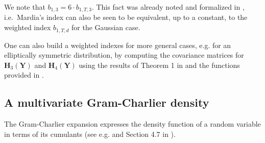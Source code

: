 We note that \(b_{1,3}=6 \cdot b_{1,T,3}\). This fact was already noted and formalized in \citet{jamma2021SJS}, i.e.~Mardia's index can also be seen to be equivalent, up to a constant, to the weighted index \(b_{1,T,d}\) for the Gaussian case.

One can also build a weighted indexes for more general cases, e.g.
for an elliptically symmetric distribution, by computing the covariance
matrices for \(\mathbf{H}_3(\mathbf{Y})\) and \(\mathbf{H}_4(\mathbf{Y})\) using the results of Theorem 1 in \citet{jamma2021SJS} and the functions provided in .

\hypertarget{a-multivariate-gram-charlier-density}{%
\subsection{A multivariate Gram-Charlier density}\label{a-multivariate-gram-charlier-density}}

The Gram-Charlier expansion expresses the density function of a random variable in terms of its cumulants (see e.g. \citet{brenn2017revisit} and Section 4.7 in \citet{terdik2021multivariate}).

